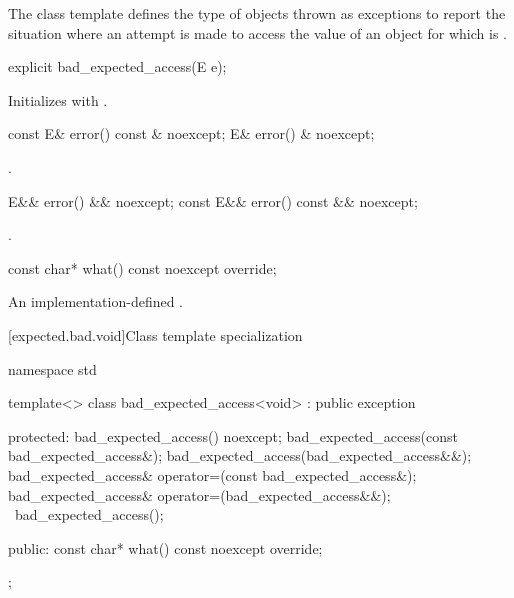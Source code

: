 \pnum
The class template 
defines the type of objects thrown as exceptions to report the situation
where an attempt is made to access the value of an  object
for which  is .

%
\begin{itemdecl}
explicit bad_expected_access(E e);
\end{itemdecl}

\begin{itemdescr}
\pnum
\effects
Initializes  with .
\end{itemdescr}

%
\begin{itemdecl}
const E& error() const & noexcept;
E& error() & noexcept;
\end{itemdecl}

\begin{itemdescr}
\pnum
\returns
{}.
\end{itemdescr}

%
\begin{itemdecl}
E&& error() && noexcept;
const E&& error() const && noexcept;
\end{itemdecl}

\begin{itemdescr}
\pnum
\returns
{}.
\end{itemdescr}

%
\begin{itemdecl}
const char* what() const noexcept override;
\end{itemdecl}

\begin{itemdescr}
\pnum
\returns
An implementation-defined \ntbs.
\end{itemdescr}

[expected.bad.void]{Class template specialization }

\begin{codeblock}
namespace std {
  template<>
  class bad_expected_access<void> : public exception {
  protected:
    bad_expected_access() noexcept;
    bad_expected_access(const bad_expected_access&);
    bad_expected_access(bad_expected_access&&);
    bad_expected_access& operator=(const bad_expected_access&);
    bad_expected_access& operator=(bad_expected_access&&);
    ~bad_expected_access();

  public:
    const char* what() const noexcept override;
  };
}
\end{codeblock}

